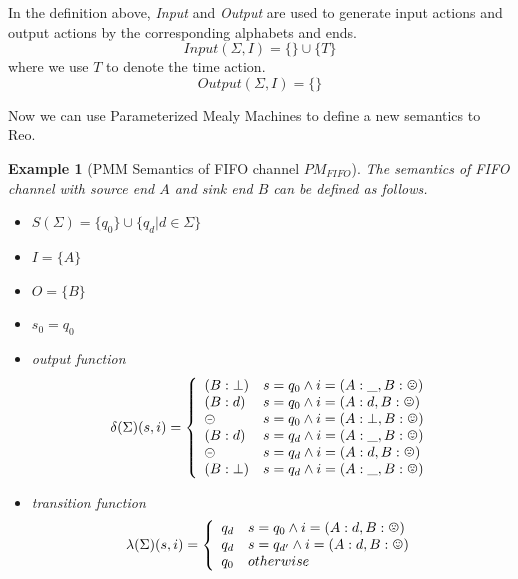 \documentclass[conference, a4paper]{IEEEtran}
\newtheorem{example}{Example}
\newcommand{\rblock}[0]{\circleddash}
\newcommand{\rread}[0]{\smiley}
\newcommand{\rnoread}[0]{\frownie}
\begin{document}
In the definition above, \emph{Input} and \emph{Output} are used to generate input actions and output actions by the corresponding alphabets and ends.
\[
Input(\Sigma,I)=\{\}\cup\{T\}
\]
where we use $T$ to denote the time action.
\[
Output(\Sigma,I)=\{\}
\]

Now we can use Parameterized Mealy Machines to define a new semantics to Reo.
\begin{example}[PMM Semantics of FIFO channel $PM_{FIFO}$]
  \label{example:pmmfifo}
  The semantics of FIFO channel with source end $A$ and sink end $B$ can be defined as follows.
  \begin{itemize}
    \item[-] $S(\Sigma)=\{q_0\}\cup\{q_d|d\in\Sigma\}$
    \item[-] $I=\{A\}$
    \item[-] $O=\{B\}$
    \item[-] $s_0=q_0$
    \item[-] output function
      \begin{displaymath}
        \delta(\Sigma)(s,i)=\left\{
        \begin{array}[h]{ll}
          (B:\bot) & s=q_0\land i=(A:\_,B:\rnoread) \\
          (B:d) & s=q_0\land i=(A:d,B:\rread)\\
          \rblock & s=q_0\land i=(A:\bot,B:\rread) \\
          (B:d) & s=q_d\land i=(A:\_,B:\rread)\\
          \rblock & s=q_d\land i=(A:d,B:\rnoread) \\
          (B:\bot) & s=q_d\land i=(A:\_,B:\rnoread) \\     
        \end{array}
        \right.
      \end{displaymath}
    \item[-] transition function
      \begin{displaymath}
        \lambda(\Sigma)(s,i)=\left\{
        \begin{array}[h]{ll}
          q_d & s=q_0\land i=(A:d,B:\rnoread) \\
          q_d & s=q_{d'}\land i=(A:d,B:\rread) \\
          q_0 & otherwise \\
        \end{array}
        \right.
      \end{displaymath}
  \end{itemize}
\end{example}
\end{document}

